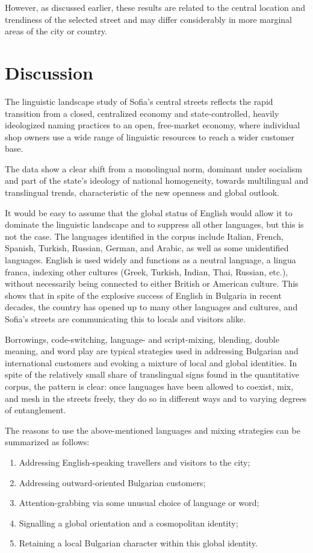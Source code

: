 \documentclass[output=paper]{langscibook}
\begin{document}
However, as discussed earlier, these results are related to the central location and trendiness of the selected street and may differ considerably in more marginal areas of the city or country.

\section{Discussion}
The linguistic landscape study of Sofia’s central streets reflects the rapid transition from a closed, centralized economy and state-controlled, heavily ideologized naming practices to an open, free-market economy, where individual shop owners use a wide range of linguistic resources to reach a wider customer base.

The data show a clear shift from a monolingual norm, dominant under socialism and part of the state’s ideology of national homogeneity, towards multilingual and translingual trends, characteristic of the new openness and global outlook. 

It would be easy to assume that the global status of English would allow it to dominate the linguistic landscape and to suppress all other languages, but this is not the case. The languages identified in the corpus include Italian, French, Spanish, Turkish, Russian, German, and Arabic, as well as some unidentified languages. English is used widely and functions as a neutral language, a lingua franca, indexing other cultures (Greek, Turkish, Indian, Thai, Russian, etc.), without necessarily being connected to either British or American culture. This shows that in spite of the explosive success of English in Bulgaria in recent decades, the country has opened up to many other languages and cultures, and Sofia’s streets are communicating this to locals and visitors alike. 

Borrowings, code-switching, language- and script-mixing, blending, double meaning, and word play are typical strategies used in addressing Bulgarian and international customers and evoking a mixture of local and global identities. In spite of the relatively small share of translingual signs found in the quantitative corpus, the pattern is clear: once languages have been allowed to coexist, mix, and mesh in the streets freely, they do so in different ways and to varying degrees of entanglement. 

The reasons to use the above-mentioned languages and mixing strategies can be summarized as follows:

\begin{enumerate}
  \item Addressing English-speaking travellers and visitors to the city;
  \item Addressing outward-oriented Bulgarian customers;
  \item Attention-grabbing via some unusual choice of language or word;
  \item Signalling a global orientation and a cosmopolitan identity;
  \item Retaining a local Bulgarian character within this global identity.
\end{enumerate}
\end{document}
